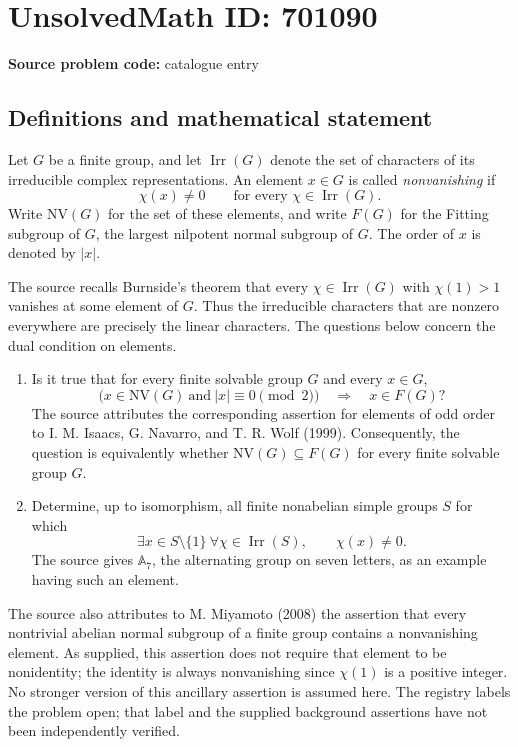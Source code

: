 \documentclass[11pt]{article}
\begin{document}
\section*{UnsolvedMath ID: 701090}
\textbf{Source problem code:} catalogue entry
\subsection{Definitions and mathematical statement}
Let \(G\) be a finite group, and let \(\operatorname{Irr}(G)\) denote the set of characters of its irreducible complex representations. An element \(x\in G\) is called \emph{nonvanishing} if
\[
\chi(x)\ne 0\qquad\text{for every }\chi\in\operatorname{Irr}(G).
\]
Write \(\mathrm{NV}(G)\) for the set of these elements, and write \(F(G)\) for the Fitting subgroup of \(G\), the largest nilpotent normal subgroup of \(G\). The order of \(x\) is denoted by \(|x|\).

The source recalls Burnside's theorem that every \(\chi\in\operatorname{Irr}(G)\) with \(\chi(1)>1\) vanishes at some element of \(G\). Thus the irreducible characters that are nonzero everywhere are precisely the linear characters. The questions below concern the dual condition on elements.

\begin{enumerate}
\item[(a)] Is it true that for every finite solvable group \(G\) and every \(x\in G\),
\[
\bigl(x\in\mathrm{NV}(G)\ \text{and}\ |x|\equiv 0\pmod 2\bigr)
\quad\Longrightarrow\quad x\in F(G)?
\]
The source attributes the corresponding assertion for elements of odd order to I. M. Isaacs, G. Navarro, and T. R. Wolf (1999). Consequently, the question is equivalently whether \(\mathrm{NV}(G)\subseteq F(G)\) for every finite solvable group \(G\).
\item[(b)] Determine, up to isomorphism, all finite nonabelian simple groups \(S\) for which
\[
\exists x\in S\setminus\{1\}\ \forall\chi\in\operatorname{Irr}(S),\qquad \chi(x)\ne 0.
\]
The source gives \(\mathbb{A}_7\), the alternating group on seven letters, as an example having such an element.
\end{enumerate}

The source also attributes to M. Miyamoto (2008) the assertion that every nontrivial abelian normal subgroup of a finite group contains a nonvanishing element. As supplied, this assertion does not require that element to be nonidentity; the identity is always nonvanishing since \(\chi(1)\) is a positive integer. No stronger version of this ancillary assertion is assumed here. The registry labels the problem open; that label and the supplied background assertions have not been independently verified.
\end{document}
